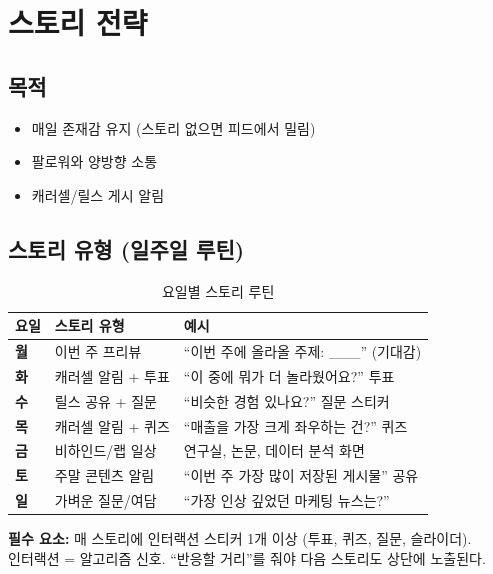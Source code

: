 \documentclass[11pt, a4paper]{article}
\begin{document}
\section{스토리 전략}

\subsection{목적}

\begin{itemize}[leftmargin=2em]
  \item 매일 존재감 유지 (스토리 없으면 피드에서 밀림)
  \item 팔로워와 양방향 소통
  \item 캐러셀/릴스 게시 알림
\end{itemize}

\subsection{스토리 유형 (일주일 루틴)}

\begin{table}[h!]
\centering
\begin{tabularx}{\textwidth}{l l Y}
\toprule
\textbf{요일} & \textbf{스토리 유형} & \textbf{예시} \\
\midrule
\textbf{월} & 이번 주 프리뷰 & ``이번 주에 올라올 주제: \_\_\_'' (기대감) \\
\textbf{화} & 캐러셀 알림 + 투표 & ``이 중에 뭐가 더 놀라웠어요?'' 투표 \\
\textbf{수} & 릴스 공유 + 질문 & ``비슷한 경험 있나요?'' 질문 스티커 \\
\textbf{목} & 캐러셀 알림 + 퀴즈 & ``매출을 가장 크게 좌우하는 건?'' 퀴즈 \\
\textbf{금} & 비하인드/랩 일상 & 연구실, 논문, 데이터 분석 화면 \\
\textbf{토} & 주말 콘텐츠 알림 & ``이번 주 가장 많이 저장된 게시물'' 공유 \\
\textbf{일} & 가벼운 질문/여담 & ``가장 인상 깊었던 마케팅 뉴스는?'' \\
\bottomrule
\end{tabularx}
\caption{요일별 스토리 루틴}
\end{table}

\begin{tcolorbox}
\textbf{필수 요소:} 매 스토리에 인터랙션 스티커 1개 이상 (투표, 퀴즈, 질문, 슬라이더). \\
인터랙션 = 알고리즘 신호. ``반응할 거리''를 줘야 다음 스토리도 상단에 노출된다.
\end{tcolorbox}
\end{document}
